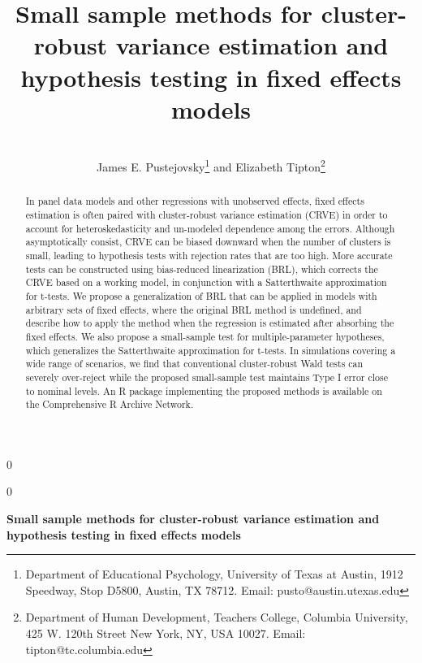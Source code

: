 \documentclass[12pt]{article}\usepackage[]{graphicx}\usepackage[]{color}
\newcommand{\blind}{0}
\begin{document}
\def\spacingset#1{\renewcommand{\baselinestretch}%
{#1}\small\normalsize} \spacingset{1}



\blind
{
  \title{\bf Small sample methods for cluster-robust variance estimation and hypothesis testing in fixed effects models}
  \author{\\James E. Pustejovsky\thanks{Department of Educational Psychology, University of Texas at Austin, 1912 Speedway, Stop D5800, Austin, TX 78712. Email: pusto@austin.utexas.edu}
    \hspace{.2cm}and\hspace{.2cm}
    Elizabeth Tipton\thanks{Department of Human Development, Teachers College, Columbia University, 425 W. 120th Street
New York, NY, USA 10027. Email: tipton@tc.columbia.edu}
    }
  \maketitle
} \fi

\blind
{
  \bigskip
  \bigskip
  \bigskip
  \begin{center}
    {\LARGE\bf Small sample methods for cluster-robust variance estimation and hypothesis testing in fixed effects models}
\end{center}
  \medskip
} \fi

\bigskip


\begin{abstract}
In panel data models and other regressions with unobserved effects, fixed effects estimation is often paired with cluster-robust variance estimation (CRVE) in order to account for heteroskedasticity and un-modeled dependence among the errors. 
Although asymptotically consist, CRVE can be biased downward when the number of clusters is small, leading to hypothesis tests with rejection rates that are too high. 
More accurate tests can be constructed using bias-reduced linearization (BRL), which corrects the CRVE based on a working model, in conjunction with a Satterthwaite approximation for t-tests. 
We propose a generalization of BRL that can be applied in models with arbitrary sets of fixed effects, where the original BRL method is undefined, and describe how to apply the method when the regression is estimated after absorbing the fixed effects. 
We also propose a small-sample test for multiple-parameter hypotheses, which generalizes the Satterthwaite approximation for t-tests. 
In simulations covering a wide range of scenarios, we find that conventional cluster-robust Wald tests can severely over-reject while the proposed small-sample test maintains Type I error close to nominal levels. 
An R package implementing the proposed methods is available on the Comprehensive R Archive Network. 
\end{abstract}
\end{document}
